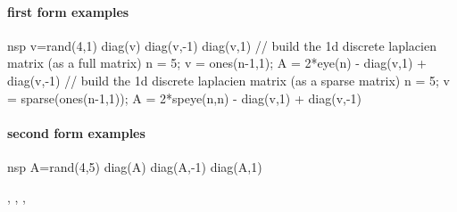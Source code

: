 \begin{examples}
\paragraph{first form examples}
\begin{mintednsp}{nsp}
v=rand(4,1) 
diag(v) 
diag(v,-1) 
diag(v,1)
// build the 1d discrete laplacien matrix (as a full matrix)
n = 5;
v = ones(n-1,1);
A = 2*eye(n) - diag(v,1) + diag(v,-1)
// build the 1d discrete laplacien matrix (as a sparse matrix)
n = 5;
v = sparse(ones(n-1,1));
A = 2*speye(n,n) - diag(v,1) + diag(v,-1)
\end{mintednsp}

\paragraph{second form examples}
\begin{mintednsp}{nsp}
A=rand(4,5) 
diag(A) 
diag(A,-1) 
diag(A,1)
\end{mintednsp}
\end{examples}

\begin{manseealso}
 , , , 
\end{manseealso}

